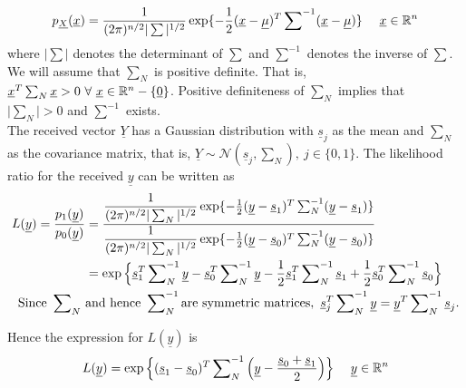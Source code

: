 \documentclass[a4paper,english,12pt]{article}
\begin{document}
\begin{equation}
p_{\underline{X}}(\underline{x})=\dfrac{1}{(2\pi)^{n/2} \vert \sum \vert ^{1/2}  } \exp \lbrace -\frac{1}{2} (\underline{x}-\underline{\mu})^T \sum\nolimits^{-1} (\underline{x} - \underline{\mu}) \rbrace \ \ \ \ \underline{x} \in \mathbb{R} ^n 
\end{equation}
where $\vert \sum \vert $ denotes the determinant of $\sum$ and $\sum ^{-1}$ denotes the inverse of $\sum$.\\
We will assume that $\sum _N$ is positive definite. That is, $\underline{x}^T\sum_{N} \underline{x} > 0 \ \forall \ \underline{x} \in \R ^n-\{\underline{0}\}$. Positive definiteness of $\sum_{N}$ implies that $\vert \sum_{N} \vert > 0$ and $\sum ^{-1} $ exists.\\

The received vector $\underline{Y}$ has a Gaussian distribution with $\underline{s}_j$ as the mean and $\sum _N$ as the covariance matrix, that is, $\underline{Y} \sim \mathcal{N}(\underline{s}_j,\sum_N), \ j \in \lbrace 0,1 \rbrace$. The likelihood ratio for the received $\underline{y}$ can be written as 
\begin{align*}
\centering
L(\underline{y})=\dfrac{p_1(\underline{y})}{p_0 (\underline{y})} &=
\dfrac{\dfrac{1}{(2\pi)^{n/2} \vert \sum_N \vert ^{1/2}  } \exp \lbrace -\frac{1}{2} (\underline{y}-\underline{s}_1)^T \sum\nolimits^{-1}_N (\underline{y} - \underline{s}_1) \rbrace}{\dfrac{1}{(2\pi)^{n/2} \vert \sum_N \vert ^{1/2}  } \exp \lbrace -\frac{1}{2} (\underline{y}-\underline{s}_0)^T \sum\nolimits^{-1}_N (\underline{y} - \underline{s}_0) \rbrace}  \\
\vspace{0.2 cm}
&= \exp\Big \lbrace \underline{s}_1^T \sum\nolimits_N^{-1} \underline{y} - \underline{s}_0^T \sum\nolimits_N^{-1} \underline{y} -\frac{1}{2}\underline{s}_1^T \sum\nolimits_N^{-1} \underline{s}_1 + \frac{1}{2}\underline{s}_0^T \sum\nolimits_N^{-1} \underline{s}_0 \Big \rbrace\\ 
\vspace{0.25 cm}
\mbox{Since} \ \sum\nolimits _N  \ &\mbox{and hence} \  \sum\nolimits_N^{-1} \mbox{are symmetric matrices} , \ 
\underline{s}_j^T \sum\nolimits_N^{-1}\underline{y} = \underline{y}^T\sum\nolimits _N^{-1} \underline{s}_j  .
\end{align*}

Hence the expression for $L(\underline{y})$ is
\begin{equation}
\label{LR}
L(\underline{y})= \exp \Big\{ (\underline{s}_1-\underline{s}_0)^T \sum\nolimits_N^{-1} \Big( \underline{y} - \frac{\underline{s}_0+\underline{s}_1}{2} \Big) \Big\} \ \ \ \ \underline{y} \in \R ^n
\end{equation}
\end{document}
